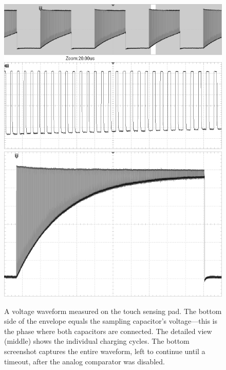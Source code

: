 \begin{figure}
	\centering
	\includegraphics[width=.9\textwidth] {img/tsc-wfm-bw.png} \\
	\vspace{5mm}
	\includegraphics[width=.9\textwidth] {img/tsc-wfm2-bw.png}
	\caption[TSC operation oscilloscope screenshots]{\label{fig:tsc_wfm}A voltage waveform measured on the touch sensing pad. The bottom side of the envelope equals the sampling capacitor's voltage---this is the phase where both capacitors are connected. The detailed view (middle) shows the individual charging cycles. The bottom screenshot captures the entire waveform, left to continue until a timeout, after the analog comparator was disabled.}
\end{figure}


